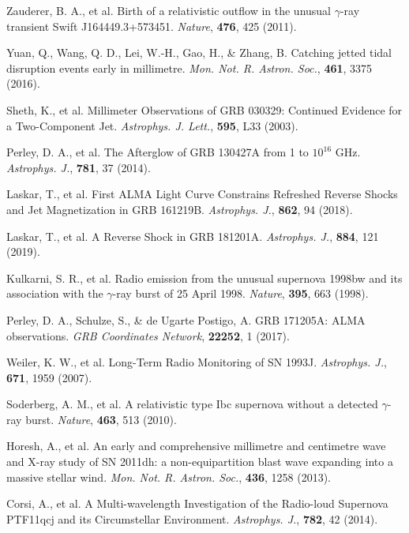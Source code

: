 \documentclass{nature_plusfigure}
\newcommand{\mn}{{Mon. Not. R. Astron. Soc.}}
\newcommand{\mnras}{\mn}
\newcommand{\apj}{{Astrophys. J.}}
\newcommand{\apjl}{{Astrophys. J. Lett.}}
\newcommand{\nat}{{Nature}}
\begin{document}
\begin{methods}
\begin{thebibliography}{10}


 Zauderer, B. A., et al. Birth of a relativistic outflow in the unusual $\gamma$-ray transient Swift J164449.3+573451. \emph{\nat}, \textbf{476}, 425 (2011). 

 Yuan, Q., Wang, Q. D., Lei, W.-H., Gao, H., \& Zhang, B. Catching jetted tidal disruption events early in millimetre. \emph{\mnras}, \textbf{461}, 3375 (2016). 

 Sheth, K., et al. Millimeter Observations of GRB 030329: Continued Evidence for a Two-Component Jet. \emph{\apjl}, \textbf{595}, L33 (2003). 

 Perley, D. A., et al. The Afterglow of GRB 130427A from 1 to $10^{16}$ GHz. \emph{\apj}, \textbf{781}, 37 (2014). 

 Laskar, T., et al. First ALMA Light Curve Constrains Refreshed Reverse Shocks and Jet Magnetization in GRB 161219B. \emph{\apj}, \textbf{862}, 94 (2018). 

 Laskar, T., et al. A Reverse Shock in GRB 181201A. \emph{\apj}, \textbf{884}, 121 (2019). 

 Kulkarni, S. R., et al. Radio emission from the unusual supernova 1998bw and its association with the $\gamma$-ray burst of 25 April 1998. \emph{\nat}, \textbf{395}, 663 (1998). 

 Perley, D. A., Schulze, S., \& de Ugarte Postigo, A. GRB 171205A: ALMA observations. \emph{GRB Coordinates Network}, \textbf{22252}, 1 (2017). 

 Weiler, K. W., et al. Long-Term Radio Monitoring of SN 1993J. \emph{\apj}, \textbf{671}, 1959 (2007). 

 Soderberg, A. M., et al. A relativistic type Ibc supernova without a detected $\gamma$-ray burst. \emph{\nat}, \textbf{463}, 513 (2010). 

 Horesh, A., et al. An early and comprehensive millimetre and centimetre wave and X-ray study of SN 2011dh: a non-equipartition blast wave expanding into a massive stellar wind. \emph{\mnras}, \textbf{436}, 1258 (2013). 

 Corsi, A., et al. A Multi-wavelength Investigation of the Radio-loud Supernova PTF11qcj and its Circumstellar Environment. \emph{\apj}, \textbf{782}, 42 (2014). 


\end{thebibliography}
\end{methods}
\end{document}
